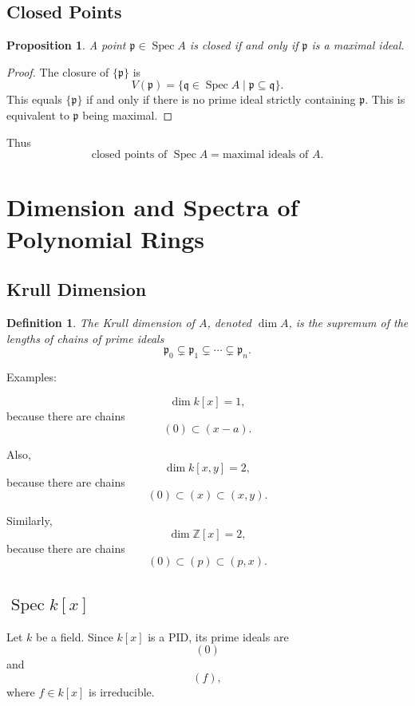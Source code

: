 \documentclass[12pt,a4paper]{article}
\newtheorem{proposition}{Proposition}[section]
\newtheorem{definition}{Definition}[section]
\newcommand{\Z}{\mathbb{Z}}
\newcommand{\Spec}{\operatorname{Spec}}
\newcommand{\mfp}{\mathfrak p}
\newcommand{\mfq}{\mathfrak q}
\begin{document}
\subsection{Closed Points}

\begin{proposition}
	A point \(\mfp\in\Spec A\) is closed if and only if \(\mfp\) is a maximal ideal.
\end{proposition}

\begin{proof}
	The closure of \(\{\mfp\}\) is
	\[
	V(\mfp)=\{\mfq\in\Spec A\mid \mfp\subseteq \mfq\}.
	\]
	This equals \(\{\mfp\}\) if and only if there is no prime ideal strictly
	containing \(\mfp\). This is equivalent to \(\mfp\) being maximal.
\end{proof}

Thus
\[
\boxed{
	\text{closed points of }\Spec A
	=
	\text{maximal ideals of }A.
}
\]

\section{Dimension and Spectra of Polynomial Rings}

\subsection{Krull Dimension}

\begin{definition}
	The Krull dimension of \(A\), denoted \(\dim A\), is the supremum of the lengths
	of chains of prime ideals
	\[
	\mfp_0\subsetneq \mfp_1\subsetneq\cdots\subsetneq \mfp_n.
	\]
\end{definition}

Examples:

\[
\dim k[x]=1,
\]
because there are chains
\[
(0)\subset (x-a).
\]

Also,
\[
\dim k[x,y]=2,
\]
because there are chains
\[
(0)\subset (x)\subset (x,y).
\]

Similarly,
\[
\dim \Z[x]=2,
\]
because there are chains
\[
(0)\subset (p)\subset (p,x).
\]

\subsection{\(\Spec k[x]\)}

Let \(k\) be a field. Since \(k[x]\) is a PID, its prime ideals are
\[
(0)
\]
and
\[
(f),
\]
where \(f\in k[x]\) is irreducible.
\end{document}
